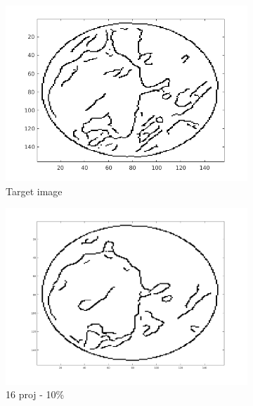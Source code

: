 \documentclass[10pt,a4paper,titlepage]{article}
\begin{document}
\begin{figure}[H]
        	
        	\begin{subfigure}[b]{0.32\textwidth}   
        	    \centering 
            	\includegraphics[width=\textwidth]{Sample1/Edges/target_auto.png}
            	\caption{Target image}
        	\end{subfigure}
        	\begin{subfigure}[b]{0.32\textwidth}   
        	    \centering 
        	    \includegraphics[width=\textwidth]{Sample1/Edges/SB/p4_auto.png}
        	    \caption{16 proj - 10\%}    
        	    \label{subfig:16p1L-D}
       		\end{subfigure}
        	\begin{subfigure}[b]{0.32\textwidth}  

\end{subfigure}
\end{figure}
\end{document}
